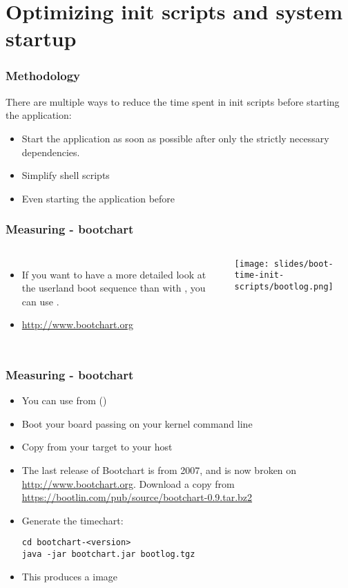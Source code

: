 \section{Optimizing init scripts and system startup}
\begin{frame}
\frametitle{Methodology}
There are multiple ways to reduce the time spent in init scripts before
starting the application:
\begin{itemize}
	\item Start the application as soon as possible after only the
              strictly necessary dependencies.
	\item Simplify shell scripts
	\item Even starting the application before 
\end{itemize}
\end{frame}

\begin{frame}
\frametitle{Measuring - bootchart}
\begin{columns}
\begin{itemize}
	\item If you want to have a more detailed look at the userland boot sequence
              than with , you can use .
	\item \url{http://www.bootchart.org}
\end{itemize}
\texttt{[image: slides/boot-time-init-scripts/bootlog.png]}
\end{columns}
\end{frame}

\begin{frame}[fragile]
\frametitle{Measuring - bootchart}
\begin{itemize}
	\item You can use  from 
	      ()
	\item Boot your board passing  on your
	      kernel command line
	\item Copy  from your target to your host
	\item The last release of Bootchart is from 2007, and is now
	      broken on \url{http://www.bootchart.org}. Download a copy
	      from \url{https://bootlin.com/pub/source/bootchart-0.9.tar.bz2}
	\item Generate the timechart:
\begin{block}{}
\begin{verbatim}
cd bootchart-<version>
java -jar bootchart.jar bootlog.tgz
\end{verbatim}
\end{block}
	\item This produces a  image
\end{itemize}
\end{frame}

